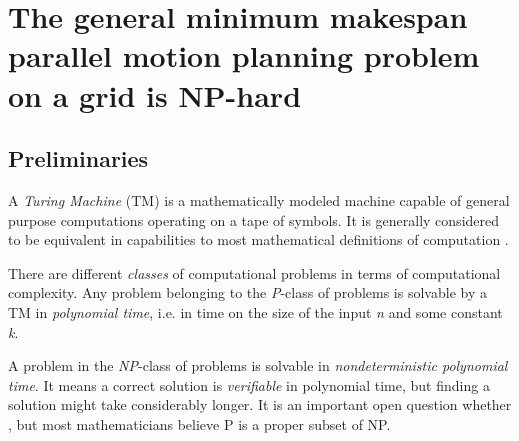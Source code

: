 \section{The general minimum makespan parallel motion planning problem on a grid is NP-hard}

\cite{siamcomp/DemaineFKMS19} \cite{corr/YuL15c}

\subsection{Preliminaries}

A \emph{Turing Machine} (TM) is a mathematically modeled machine capable of general purpose computations operating on a tape of symbols. It is generally considered to be equivalent in capabilities to most mathematical definitions of computation \cite{aw/HopcroftU79}.
%
%

There are different \emph{classes} of computational problems in terms of computational complexity. Any problem belonging to the \emph{P}-class of problems is solvable by a TM in \emph{polynomial time}, i.e. in  time on the size of the input \emph{n} and some constant \emph{k}.

A problem in the \emph{NP}-class of problems is solvable in \emph{nondeterministic polynomial time}. It means a correct solution is \emph{verifiable} in polynomial time, but finding a solution might take considerably longer. It is an important open question whether , but most mathematicians believe P is a proper subset of NP.


